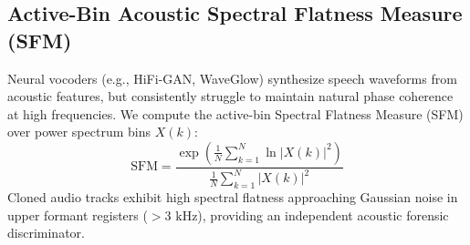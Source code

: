 \documentclass[journal]{IEEEtran}
\begin{document}
\begin{table}[!t]
\caption{Detailed Layer-by-Layer Architectural Specifications of FreqForensics-XAI}
\label{tab:layer_specs}
\centering
{}
\end{table}

\subsection{Active-Bin Acoustic Spectral Flatness Measure (SFM)}
Neural vocoders (e.g., HiFi-GAN, WaveGlow) synthesize speech waveforms from acoustic features, but consistently struggle to maintain natural phase coherence at high frequencies. We compute the active-bin Spectral Flatness Measure (SFM) over power spectrum bins $X(k)$:
\begin{equation}
\text{SFM} = \frac{\exp\left( \frac{1}{N} \sum_{k=1}^N \ln |X(k)|^2 \right)}{\frac{1}{N} \sum_{k=1}^N |X(k)|^2}
\end{equation}
Cloned audio tracks exhibit high spectral flatness approaching Gaussian noise in upper formant registers ($>3\text{ kHz}$), providing an independent acoustic forensic discriminator.
\end{document}
